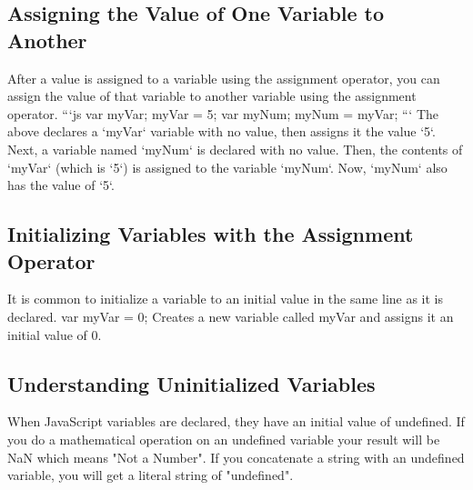 \documentclass{article}%
\begin{document}
%
\subsection{Assigning the Value of One Variable to Another}%
\label{subsec:AssigningtheValueofOneVariabletoAnother}%
After a value is assigned to a variable using the assignment operator, you can assign the value of that variable to another variable using the assignment operator.\newline%
```js\newline%
var myVar;\newline%
myVar = 5;\newline%
var myNum;\newline%
myNum = myVar;\newline%
```\newline%
The above declares a `myVar` variable with no value, then assigns it the value `5`. Next, a variable named `myNum` is declared with no value. Then, the contents of `myVar` (which is `5`) is assigned to the variable `myNum`. Now, `myNum` also has the value of `5`.\newline%

%
\subsection{Initializing Variables with the Assignment Operator}%
\label{subsec:InitializingVariableswiththeAssignmentOperator}%
It is common to initialize a variable to an initial value in the same line as it is declared.\newline%
var myVar = 0;\newline%
Creates a new variable called myVar and assigns it an initial value of 0.\newline%

%
\subsection{Understanding Uninitialized Variables}%
\label{subsec:UnderstandingUninitializedVariables}%
When JavaScript variables are declared, they have an initial value of undefined. If you do a mathematical operation on an undefined variable your result will be NaN which means "Not a Number". If you concatenate a string with an undefined variable, you will get a literal string of "undefined".\newline%

%
\end{document}

